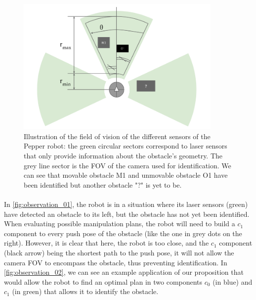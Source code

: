 \begin{figure}[H]
  \centering
  \includegraphics[width=10cm]{Figures/Observation_Proposition/Robot_Camera_FOV.png}
  \caption{Illustration of the field of vision of the different sensors of the Pepper robot: the green circular sectors correspond to laser sensors that only provide information about the obstacle's geometry. The grey line sector is the FOV of the camera used for identification. We can see that movable obstacle M1 and unmovable obstacle O1 have been identified but another obstacle "?" is yet to be.}
  \label{fig:robot_camera_fov}
\end{figure}

\paragraph{}In \ref{fig:observation_01}, the robot is in a situation where its laser sensors (green) have detected an obstacle to its left, but the obstacle has not yet been identified. When evaluating possible manipulation plans, the robot will need to build a $c_{1}$ component to every push pose of the obstacle (like the one in grey dots on the right). However, it is clear that here, the robot is too close, and the $c_{1}$ component (black arrow) being the shortest path to the push pose, it will not allow the camera FOV to encompass the obstacle, thus preventing identification. In \ref{fig:observation_02}, we can see an example application of our proposition that would allow the robot to find an optimal plan in two components $c_{0}$ (in blue) and $c_{1}$ (in green) that allows it to identify the obstacle.


